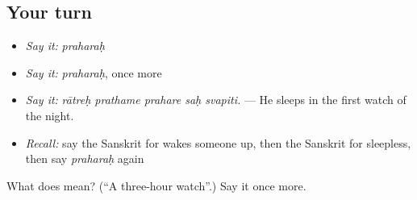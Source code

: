\subsection*{Your turn}
\begin{itemize}
\raggedright
  \item \emph{Say it:} \emph{praharaḥ}
  \item \emph{Say it:} \emph{praharaḥ}, once more
  \item \emph{Say it:} \emph{rātreḥ prathame prahare saḥ svapiti.} — He sleeps in the first watch of the night.
  \item \emph{Recall:} say the Sanskrit for wakes someone up, then the Sanskrit for sleepless, then say \emph{praharaḥ} again
\end{itemize}

\begin{tcolorbox}[breakable,colback=teal!4,colframe=teal!35!black,title={Before you move on}]
What does  mean? (\textquotedblleft{}A three-hour watch\textquotedblright{}.) Say it once more.
\end{tcolorbox}
